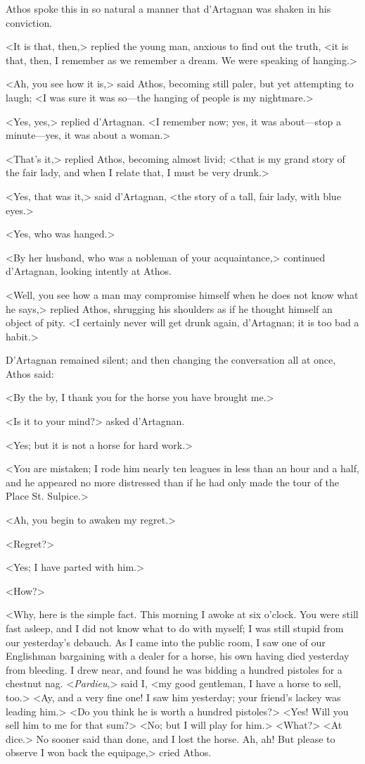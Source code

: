Athos spoke this in so natural a manner that d'Artagnan was shaken in his conviction. 

<It is that, then,> replied the young man, anxious to find out the truth, <it is that, then, I remember as we remember a dream. We were speaking of hanging.> 

<Ah, you see how it is,> said Athos, becoming still paler, but yet attempting to laugh; <I was sure it was so---the hanging of people is my nightmare.> 

<Yes, yes,> replied d'Artagnan. <I remember now; yes, it was about---stop a minute---yes, it was about a woman.> 

<That's it,> replied Athos, becoming almost livid; <that is my grand story of the fair lady, and when I relate that, I must be very drunk.> 

<Yes, that was it,> said d'Artagnan, <the story of a tall, fair lady, with blue eyes.> 

<Yes, who was hanged.> 

<By her husband, who was a nobleman of your acquaintance,> continued d'Artagnan, looking intently at Athos. 

<Well, you see how a man may compromise himself when he does not know what he says,> replied Athos, shrugging his shoulders as if he thought himself an object of pity. <I certainly never will get drunk again, d'Artagnan; it is too bad a habit.> 

D'Artagnan remained silent; and then changing the conversation all at once, Athos said: 

<By the by, I thank you for the horse you have brought me.> 

<Is it to your mind?> asked d'Artagnan. 

<Yes; but it is not a horse for hard work.> 

<You are mistaken; I rode him nearly ten leagues in less than an hour and a half, and he appeared no more distressed than if he had only made the tour of the Place St. Sulpice.> 

<Ah, you begin to awaken my regret.> 

<Regret?> 

<Yes; I have parted with him.> 

<How?> 

<Why, here is the simple fact. This morning I awoke at six o'clock. You were still fast asleep, and I did not know what to do with myself; I was still stupid from our yesterday's debauch. As I came into the public room, I saw one of our Englishman bargaining with a dealer for a horse, his own having died yesterday from bleeding. I drew near, and found he was bidding a hundred pistoles for a chestnut nag. <\textit{Pardieu},> said I, <my good gentleman, I have a horse to sell, too.> <Ay, and a very fine one! I saw him yesterday; your friend's lackey was leading him.> <Do you think he is worth a hundred pistoles?> <Yes! Will you sell him to me for that sum?> <No; but I will play for him.> <What?> <At dice.> No sooner said than done, and I lost the horse. Ah, ah! But please to observe I won back the equipage,> cried Athos. 

